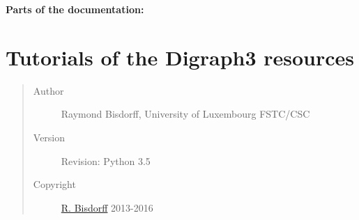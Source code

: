 \documentclass[letterpaper,10pt,english]{sphinxmanual}
\begin{document}
\textbf{Parts of the documentation:}


\section{Tutorials of the Digraph3 resources}
\label{tutorial::doc}\label{tutorial:tutorial-label}\label{tutorial:tutorials-of-the-digraph3-resources}\begin{quote}\begin{description}
\item[{Author}] \leavevmode
Raymond Bisdorff, University of Luxembourg FSTC/CSC

\item[{Version}] \leavevmode
Revision: Python 3.5

\item[{Copyright}] \leavevmode
\href{http://leopold-loewenheim.uni.lu/bisdorff/}{R. Bisdorff} 2013-2016

\end{description}\end{quote}
\end{document}
